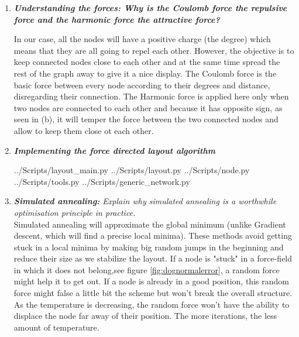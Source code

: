 \documentclass[10pt,a4paper]{article}
\begin{document}
\begin{enumerate}
	
	\item \textit{\textbf{\textbf{Understanding the forces:} Why is the Coulomb force the repulsive force and the harmonic force the attractive force?}}
		
		In our case, all the nodes will have a positive charge (the degree) which means that they are all going to repel each other. However, the objective is to keep connected nodes close to each other and at the same time spread the rest of the graph away to give it a nice display. The Coulomb force is the basic force between every node according to their degrees and distance, disregarding their connection. The Harmonic force is applied here only when two nodes are connected to each other and because it has opposite sign, as seen in (b), it will temper the force between the two connected nodes and allow to keep them close ot each other.  
		
	
	
	\newpage
	\item \textit{\textbf{Implementing the force directed layout algorithm}}
	
		 {../Scripts/layout\string_main.py}
		 {../Scripts/layout.py}
		 {../Scripts/node.py}
		 {../Scripts/tools.py}
		 {../Scripts/generic\string_network.py}
		
		
		
		
	
	\newpage
	\item \textit{\textbf{Simulated annealing:} Explain why simulated annealing is a worthwhile optimisation principle in practice.}\\
	Simulated annealing will approximate the global minimum (unlike Gradient descent, which will find a precise local minima). These methods avoid getting stuck in a local minima by making big random jumps in the beginning and reduce their size as we stabilize the layout. If a node is "stuck" in a force-field in which it does not belong,see figure \ref{fig:dognormalerror}, a random force might help it to get out. If a node is already in a good position, this random force might false a little bit the scheme but won't break the overall structure. As the temperature is decreasing, the random force won't have the ability to displace the node far away of their position. The more iterations, the less amount of temperature. \\
	

\end{enumerate}
\end{document}
